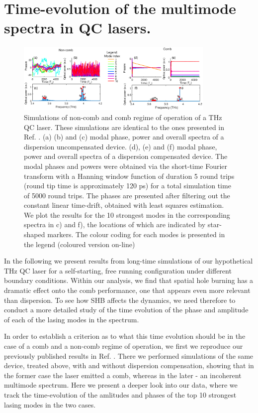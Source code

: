 \documentclass[journal]{IEEEtran}
\begin{document}
	\section{Time-evolution of the multimode spectra in QC lasers.}
	\begin{figure}[h!]
		\centering
		\includegraphics[width=0.85\textwidth]{IMGS/COMB_vs_NOCOMB1}
		\caption{Simulations of non-comb and comb regime of operation of a THz QC laser. These simulations are identical to the ones presented in Ref. \cite{petz2016}. (a) (b) and (c) modal phase, power and overall spectra of a dispersion uncompensated device. (d), (e) and (f) modal phase, power and overall spectra of a dispersion compensated device. The modal phases and powers were obtained via the short-time Fourier transform with a Hanning window function of duration 5 round trips (round tip time is approximately 120 ps) for a total simulation time of 5000 round trips. The phases are presented after filtering out the constant linear time-drift, obtained with least squares estimation. We plot the results for the 10 strongest modes in the corresponding spectra in c) and f), the locations of which are indicated by star-shaped markers.  The colour coding for each modes is presented in the legend (coloured version on-line)}	\label{fig:combnocomb1}
	\end{figure}
	
	In the following we present results from long-time simulations of our hypothetical THz QC laser for a self-starting, free running configuration under different boundary conditions. Within our analysis, we find that spatial hole burning has a dramatic effect onto the comb performance, one that appears even more relevant than dispersion. To see how SHB affects the dynamics, we need therefore to conduct a more detailed study of the time evolution of the phase and amplitude of each of the lasing modes in the spectrum. 
	
	In order to establish a criterion as to what this time evolution should be in the case of a comb and a non-comb regime of operation, we first we reproduce our previously published results in Ref. \cite{petz2016}. There we performed simulations of the same device, treated above, with and without dispersion compensation, showing that in the former case the laser emitted a comb, whereas in the later - an incoherent multimode spectrum. Here we present a deeper look into our data, where we track the time-evolution of the amlitudes and phases of the top 10 strongest lasing modes in the two cases. 
	
\end{document}
